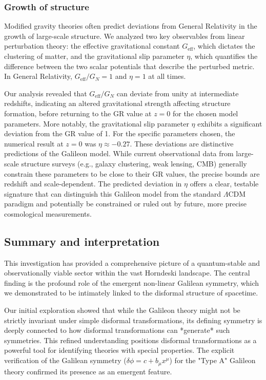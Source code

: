 \documentclass[twocolumn]{aastex631}
\begin{document}
\subsubsection{Growth of structure}
Modified gravity theories often predict deviations from General Relativity in the growth of large-scale structure. We analyzed two key observables from linear perturbation theory: the effective gravitational constant $G_{\text{eff}}$, which dictates the clustering of matter, and the gravitational slip parameter $\eta$, which quantifies the difference between the two scalar potentials that describe the perturbed metric. In General Relativity, $G_{\text{eff}}/G_N = 1$ and $\eta=1$ at all times.

Our analysis revealed that $G_{\text{eff}}/G_N$ can deviate from unity at intermediate redshifts, indicating an altered gravitational strength affecting structure formation, before returning to the GR value at $z=0$ for the chosen model parameters. More notably, the gravitational slip parameter $\eta$ exhibits a significant deviation from the GR value of 1. For the specific parameters chosen, the numerical result at $z=0$ was $\eta \approx -0.27$. These deviations are distinctive predictions of the Galileon model. While current observational data from large-scale structure surveys (e.g., galaxy clustering, weak lensing, CMB) generally constrain these parameters to be close to their GR values, the precise bounds are redshift and scale-dependent. The predicted deviation in $\eta$ offers a clear, testable signature that can distinguish this Galileon model from the standard $\Lambda$CDM paradigm and potentially be constrained or ruled out by future, more precise cosmological measurements.

\subsection{Summary and interpretation}
This investigation has provided a comprehensive picture of a quantum-stable and observationally viable sector within the vast Horndeski landscape. The central finding is the profound role of the emergent non-linear Galilean symmetry, which we demonstrated to be intimately linked to the disformal structure of spacetime.

Our initial exploration showed that while the Galileon theory might not be strictly invariant under simple disformal transformations, its defining symmetry is deeply connected to how disformal transformations can *generate* such symmetries. This refined understanding positions disformal transformations as a powerful tool for identifying theories with special properties. The explicit verification of the Galilean symmetry ($\delta\phi = c + b_\mu x^\mu$) for the "Type A" Galileon theory confirmed its presence as an emergent feature.
\end{document}
